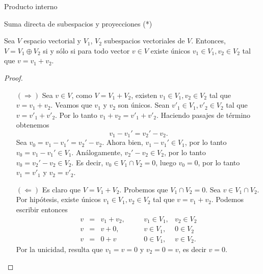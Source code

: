 \begin{chapter}{Producto interno}
\begin{section}{Suma directa de subespacios y proyecciones  (*)}
		\begin{proposicion}
			Sea $V$  espacio vectorial y $V_1$, $V_2$ subespacios vectoriales de $V$. Entonces, $V = V_1 \oplus V_2$ si y sólo si para todo vector $v \in V$ existe únicos  $v_1\in V_1, v_2 \in V_2$ tal que $v = v_1 + v_2$. 
		\end{proposicion}
		\begin{proof} {\,${}^{}$}
			\begin{enumerate}
				\item[$(\Rightarrow)$] Sea $v \in V$,  como $V = V_1 + V_2$, existen $v_1\in V_1, v_2 \in V_2$ tal que $v = v_1 + v_2$. Veamos que $v_1$ y $v_2$ son  únicos. Sean $v'_1\in V_1, v'_2 \in V_2$ tal que $v = v'_1 + v'_2$. Por lo tanto $v_1 + v_2 =  v'_1 + v'_2$. Haciendo pasajes de término obtenemos 
				$$
				v_1 -v_1' = v_2' - v_2.
				$$
				Sea  $v_0=v_1 -v_1' = v_2' - v_2$. Ahora bien, $v_1 -v_1' \in V_1$, por lo tanto $v_0= v_1 -v_1'  \in V_1$. Análogamente,  $v_2' -v_2 \in V_2$, por lo tanto $v_0= v_2' -v_2  \in V_2$. Es decir, $v_0 \in V_1 \cap V_2 = 0$, luego $v_0 =0$, por lo tanto $v_1 = v'_1$ y $v_2 = v'_2$. 
				\item[$(\Leftarrow)$] Es claro que $V = V_1 + V_2$. Probemos que $V_1 \cap V_2 = 0$. Sea $v \in V_1 \cap V_2$. Por hipótesis, existe únicos $v_1\in V_1, v_2 \in V_2$ tal que $v = v_1 + v_2$.
				Podemos escribir  entonces
				$$
				\begin{array}{rcllll}
				v &=& v_1 + v_2,& \quad &v_1\in V_1,& v_2 \in V_2 \\
				v &=& v + 0,& \quad &v\in V_1, &0 \in V_2 \\
				v &=& 0 + v& \quad &0\in V_1, &v \in V_2. 
				\end{array}
				$$
				Por la unicidad, resulta que $v_1 = v= 0$ y $v_2 = 0 =v$, es decir $v =0$.
			\end{enumerate}	
			
		\end{proof}
		\medskip 
		

\end{section}
\end{chapter}
